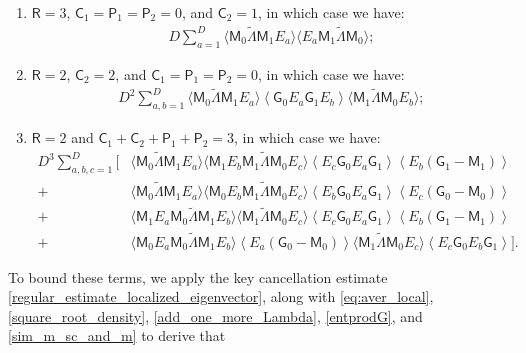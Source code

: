 \documentclass[10pt,reqno]{amsart}
\numberwithin{equation}{section}
\numberwithin{figure}{section}
\theoremstyle{plain} %
\theoremstyle{definition} %
\newcommand{\wt}{\widetilde}
\newcommand{\sG}{\mathsf G}
\newcommand{\sM}{\mathsf M}
\newcommand{\sR}{\mathsf R}
\newcommand{\sC}{\mathsf C}
\newcommand{\sP}{\mathsf P}
\newcommand{\pa}[1]{\left({#1}\right)}
\newcommand{\avg}[1]{\langle #1 \rangle}
\newcommand{\avga}[1]{\left\langle #1 \right\rangle}
\newcommand{\tLambda}{{\wt{\Lambda}}}
\newcommand{\dsum}[1]{\sum_{#1=1}^D}
\numberwithin{equation}{section}
\begin{document}
      \begin{enumerate}
          \item $\sR=3$, $\sC_1=\sP_1=\sP_2=0$, and $\sC_2=1$, in which case we have:
          \begin{equation}\label{sR_3_sC_2_2_sC_1_sP_1_sP_2_0}
              \begin{aligned}
                  D\dsum{a}\avg{\sM_0 \tLambda \sM_1 E_a}\avg{E_a \sM_1 \tLambda \sM_0};
              \end{aligned}
          \end{equation}
          \item $\sR=2$, $\sC_2=2$, and $\sC_1=\sP_1=\sP_2=0$, in which case we have:
          \begin{equation}\label{sR_2_sC_2_2_sC_1_sP_1_sP_2_0}
              \begin{aligned}
                  D^2\dsum{a,b}\avg{\sM_0\tLambda\sM_1 E_a}\avga{\sG_0 E_a\sG_1 E_b}\avg{\sM_1\tLambda\sM_0 E_b};
              \end{aligned}
          \end{equation}
          \item $\sR=2$ and $\sC_1+\sC_2+\sP_1+\sP_2=3$, in which case we have:
          \begin{equation}\label{sR_2_sC_2_2_sC_1_1_sP_1_sP_2_0}
              \begin{aligned}
                  D^3\dsum{a,b,c}\Big[&\avg{\sM_0\tLambda\sM_1 E_a}\avg{\sM_1 E_b \sM_1 \tLambda \sM_0 E_c}\avga{E_c\sG_0 E_a \sG_1}\avga{E_b\pa{\sG_1-\sM_1}}\\
                  +&\avg{\sM_0\tLambda\sM_1 E_a}\avg{\sM_0 E_b \sM_1\tLambda\sM_0 E_c}\avga{E_b \sG_0 E_a \sG_1}\avga{E_c\pa{\sG_0-\sM_0}}\\
                  +&\avg{\sM_1 E_a \sM_0 \tLambda \sM_1 E_b}\avg{\sM_1 \tLambda \sM_0 E_c}\avga{E_c \sG_0 E_a \sG_1}\avga{E_b\pa{\sG_1-\sM_1}}\\
                  +& \avg{\sM_0 E_a \sM_0 \tLambda \sM_1 E_b}\avga{E_a\pa{\sG_0-\sM_0}}\avg{\sM_1\tLambda\sM_0 E_c}\avga{E_c \sG_0 E_b \sG_1}\Big].
              \end{aligned}
          \end{equation}
      \end{enumerate}
  To bound these terms, we apply the key cancellation estimate \eqref{regular_estimate_localized_eigenvector}, along with \eqref{eq:aver_local}, \eqref{square_root_density}, \eqref{add_one_more_Lambda}, \eqref{entprodG}, and \eqref{sim_m_sc_and_m} to derive that 
\end{document}
